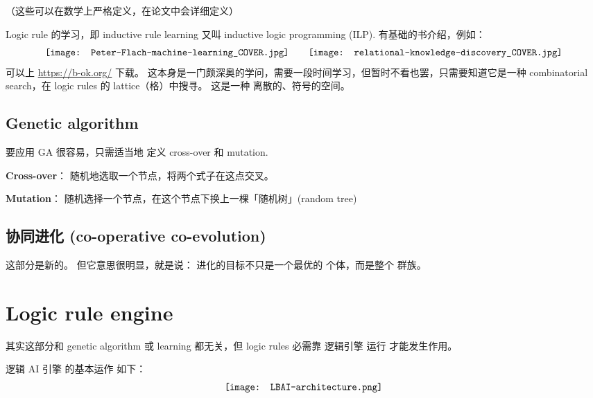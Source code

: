 （这些可以在数学上严格定义，在论文中会详细定义）

Logic rule 的学习，即 inductive rule learning 又叫 inductive logic programming (ILP).  有基础的书介绍，例如：
\begin{equation}
\vcenter{\hbox{\texttt{[image: Peter-Flach-machine-learning\_COVER.jpg]}}}
\quad \quad
\vcenter{\hbox{\texttt{[image: relational-knowledge-discovery\_COVER.jpg]}}}
\end{equation}
可以上 \href{https://b-ok.org/}{https://b-ok.org/} 下载。  这本身是一门颇深奥的学问，需要一段时间学习，但暂时不看也罢，只需要知道它是一种 combinatorial search，在 logic rules 的 lattice（格）中搜寻。 这是一种 离散的、符号的空间。

\subsection{Genetic algorithm}

要应用 GA 很容易，只需适当地 定义 cross-over 和 mutation.

\textbf{Cross-over}： 随机地选取一个节点，将两个式子在这点交叉。 

\textbf{Mutation}： 随机选择一个节点，在这个节点下换上一棵「随机树」(random tree)

\subsection{协同进化 (co-operative co-evolution)}

这部分是新的。 但它意思很明显，就是说： 进化的目标不只是一个最优的 个体，而是整个 群族。

\section{Logic rule engine}

其实这部分和 genetic algorithm 或 learning 都无关，但 logic rules 必需靠 逻辑引擎 运行 才能发生作用。 

逻辑 AI 引擎 的基本运作 如下：
\begin{equation}
\vcenter{\hbox{\texttt{[image: LBAI-architecture.png]}}}
\end{equation}

